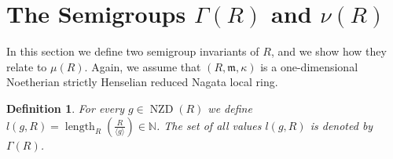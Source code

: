 \documentclass{article}
\newtheorem{definition}[theorem]{Definition}
\newtheorem{lemma}[theorem]{Lemma}
\newtheorem{proposition}[theorem]{Proposition}
\DeclareMathOperator{\length}{length}
\DeclareMathOperator{\chara}{char}
\DeclareMathOperator{\edim}{edim}
\DeclareMathOperator{\NZD}{NZD}
\DeclareMathOperator{\mult}{mult}
\numberwithin{theorem}{section}
\begin{document}









 
\section{The Semigroups $\Gamma(R)$ and $\nu(R)$}\label{sec:semigroup}

In this section we define two semigroup invariants of $R$, and we  show how they relate to $\mu(R)$. Again, we assume that $(R, \mathfrak{m}, \kappa)$ is a one-dimensional Noetherian strictly Henselian reduced Nagata local ring.

\begin{definition}
    For every $g \in \NZD(R)$ we define $l(g, R)=\length_R\left(\frac{R}{\langle g \rangle}\right) \in \mathbb{N}$. The set of all values $l(g,R)$ is denoted by $\Gamma(R)$. 
\end{definition}
\end{document}
